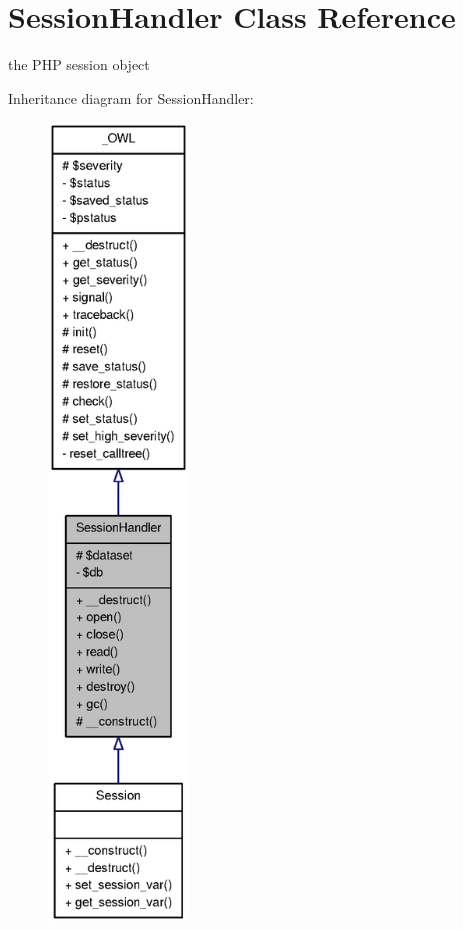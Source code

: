 \section{SessionHandler Class Reference}
\label{classSessionHandler}


the PHP session object  




Inheritance diagram for SessionHandler:\nopagebreak
\begin{figure}[H]
\begin{center}
\leavevmode
\includegraphics[height=600pt]{classSessionHandler__inherit__graph}
\end{center}
\end{figure}


